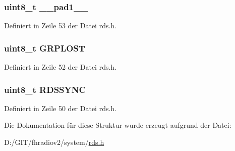 \subsubsection[{\+\_\+\+\_\+pad1\+\_\+\+\_\+}]{\setlength{\rightskip}{0pt plus 5cm}uint8\+\_\+t \+\_\+\+\_\+pad1\+\_\+\+\_\+}\label{structsync_a77f12d2e278bd5c07712648ac0df5e08}


Definiert in Zeile 53 der Datei rds.\+h.

\hypertarget{structsync_a430b332cff3a3786c4854defcd95d078}{}
\subsubsection[{G\+R\+P\+L\+O\+S\+T}]{\setlength{\rightskip}{0pt plus 5cm}uint8\+\_\+t G\+R\+P\+L\+O\+S\+T}\label{structsync_a430b332cff3a3786c4854defcd95d078}


Definiert in Zeile 52 der Datei rds.\+h.

\hypertarget{structsync_acdf4253982980384be3340fd9a9ab7c5}{}
\subsubsection[{R\+D\+S\+S\+Y\+N\+C}]{\setlength{\rightskip}{0pt plus 5cm}uint8\+\_\+t R\+D\+S\+S\+Y\+N\+C}\label{structsync_acdf4253982980384be3340fd9a9ab7c5}


Definiert in Zeile 50 der Datei rds.\+h.



Die Dokumentation für diese Struktur wurde erzeugt aufgrund der Datei\+:\begin{DoxyCompactItemize}
\item 
D\+:/\+G\+I\+T/fhradiov2/system/\hyperlink{rds_8h}{rds.\+h}\end{DoxyCompactItemize}
